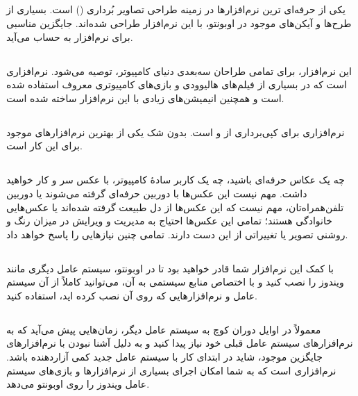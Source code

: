 \subsection[Inkscape]{}
یکی از حرفه‌ای ترین نرم‌افزارها در زمینه طراحی تصاویر بُرداری () است. بسیاری از طرح‌ها و آیکن‌های موجود در اوبونتو، با این نرم‌افزار طراحی شده‌اند.  جایگزین مناسبی برای نرم‌افزار  به حساب می‌آید.

\subsection[Blender]{}
این نرم‌افزار، برای تمامی طراحان سه‌بعدی دنیای کامپیوتر، توصیه می‌شود.  نرم‌افزاری است که در بسیاری از فیلم‌های هالیوودی و بازی‌های کامپیوتری معروف استفاده شده است و همچنین انیمیشن‌های زیادی با این نرم‌افزار ساخته شده است.

\subsection[K3b]{}
نرم‌افزاری برای کپی‌برداری از  و  است.  بدون شک یکی از بهترین نرم‌افزارهای موجود برای این کار است.

\subsection[Darktable]{}
چه یک عکاس حرفه‌ای باشید، چه یک کاربر سادهٔ کامپیوتر، با عکس سر و کار خواهید داشت. مهم نیست این عکس‌ها با دوربین حرفه‌ای گرفته می‌شوند یا دوربین تلفن‌همراه‌تان، مهم نیست که این عکس‌ها از دل طبیعت گرفته شده‌اند یا عکس‌هایی خانوادگی هستند؛ تمامی این عکس‌ها احتیاج به مدیریت و ویرایش در میزان رنگ و روشنی تصویر یا تغییراتی از این دست دارند.  تمامی چنین نیازهایی را پاسخ خواهد داد.

\subsection[Virtualbox]{}
با کمک این نرم‌افزار شما قادر خواهید بود تا در اوبونتو، سیستم عامل دیگری مانند ویندوز را نصب کنید و با اختصاص منابع سیستمی به آن، می‌توانید کاملاً از آن سیستم عامل و نرم‌افزارهایی که روی آن نصب کرده اید، استفاده کنید.

\subsection[Wine]{}
معمولاً در اوایل دوران کوچ به سیستم عامل دیگر، زمان‌هایی پیش می‌آید که به نرم‌افزارهای سیستم عامل قبلی خود نیاز پیدا کنید و به دلیل آشنا نبودن با نرم‌افزارهای جایگزین موجود، شاید در ابتدای کار با سیستم عامل جدید کمی آزار‌دهنده باشد.  نرم‌افزاری است که به شما امکان اجرای بسیاری از نرم‌افزارها و بازی‌های سیستم عامل ویندوز را روی اوبونتو می‌دهد.

